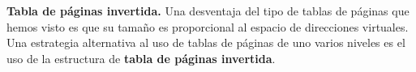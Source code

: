 \documentclass{article}
\begin{document}
 		\textbf{Tabla de páginas invertida.} Una desventaja del tipo de tablas de páginas que hemos visto es que su tamaño es proporcional al espacio de direcciones virtuales. \\
 		
 		Una estrategia alternativa al uso de tablas de páginas de uno varios niveles es el uso de la estructura de \textbf{tabla de páginas invertida}. 
		
		
								
\end{document}
